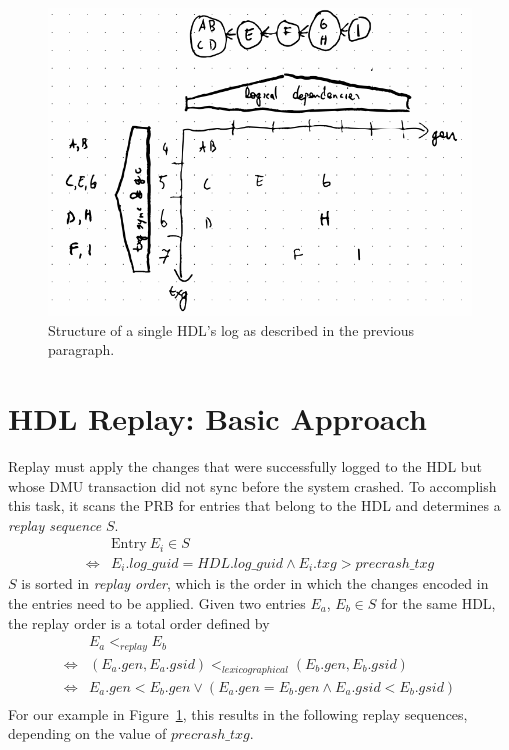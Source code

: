 \documentclass[12pt,a4paper,twoside]{book}
\begin{document}
{\begin{figure}[H]
    \includegraphics{fig/prb_hdl_log_structure_example}
    \caption{Structure of a single HDL's log as described in the previous paragraph.}
    \label{fig:prb_hdl_log_structure_example}
\end{figure}

\section{HDL Replay: Basic Approach}\label{di:prb:replayapproach}
Replay must apply the changes that were successfully logged to the HDL but whose DMU transaction did not sync before the system crashed.
To accomplish this task, it scans the PRB for entries that belong to the HDL and determines a \textit{replay sequence} $S$.
\begin{align*}
    & \text{Entry}~E_i \in S \\
    \Leftrightarrow & E_i.log\_guid = HDL.log\_guid \wedge E_i.txg > precrash\_txg
\end{align*}
$S$ is sorted in \textit{replay order}, which is the order in which the changes encoded in the entries need to be applied.
Given two entries $E_a$, $E_b \in S$ for the same HDL, the replay order is a total order defined by
\begin{align*}
    & E_a <_{replay} E_b \\
    \Leftrightarrow &  (E_a.gen, E_a.gsid) <_{lexicographical} (E_b.gen, E_b.gsid) \\
    \Leftrightarrow & E_a.gen < E_b.gen \vee (E_a.gen = E_b.gen \wedge E_a.gsid < E_b.gsid) \\
\end{align*}
For our example in Figure~\ref{fig:prb_hdl_log_structure_example}, this results in the following replay sequences, depending on the value of $precrash\_txg$.


}
\end{document}
